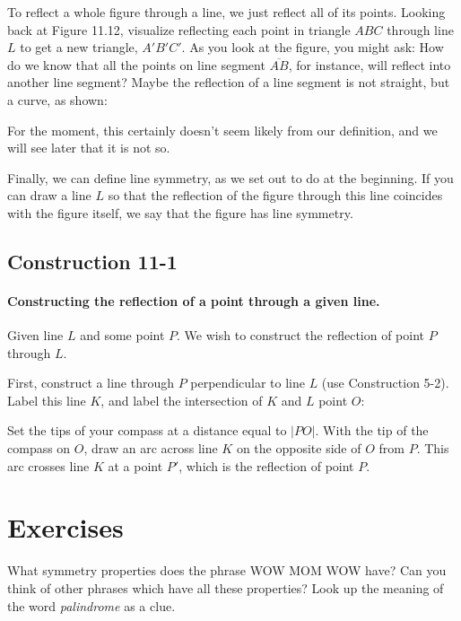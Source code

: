 \documentclass[12pt]{book} %
\begin{document}
\begin{ExerciseList}
To reflect a whole figure through a line, we just reflect all of its points. Looking back at Figure 11.12, visualize reflecting each point in triangle $ABC$ through line $L$ to get a new triangle, $A'B'C'$. As you look at the figure, you might ask: How do we know that all the points on line segment $\overline{AB}$, for instance, will reflect into another line segment? Maybe the reflection of a line segment is not straight, but a curve, as shown:


For the moment, this certainly doesn't seem likely from our definition, and we will see later that it is not so.

Finally, we can define line symmetry, as we set out to do at the beginning. If you can draw a line $L$ so that the reflection of the figure through this line coincides with the figure itself, we say that the figure has line symmetry.

\subsection*{Construction 11-1}

\paragraph{Constructing the reflection of a point through a given line.}

Given line $L$ and some point $P$. We wish to construct the reflection of point $P$ through $L$.

First, construct a line through $P$ perpendicular to line $L$ (use Construction 5-2). Label this line $K$, and label the intersection of $K$ and $L$ point $O$:


Set the tips of your compass at a distance equal to $|PO|$. With the tip of the compass on $O$, draw an arc across line $K$ on the opposite side of $O$ from $P$. This arc crosses line $K$ at a point $P'$, which is the reflection of point $P$.

\section*{Exercises}

\setcounter{Exercise}{0}
\begin{ExerciseList}
\Exercise What symmetry properties does the phrase WOW MOM WOW have? Can you think of other phrases which have all these properties? Look up the meaning of the word \textit{palindrome} as a clue.


\end{ExerciseList}
\end{ExerciseList}
\end{document}
